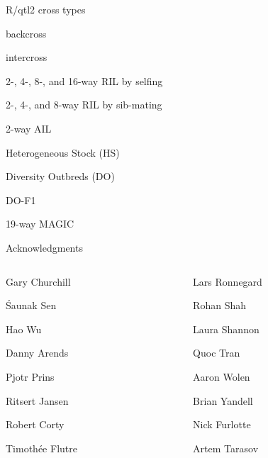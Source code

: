 \documentclass[12pt,t]{beamer}
\begin{document}
\begin{frame}{R/qtl2 cross types}

  \bbi
\item backcross
\item intercross
\item 2-, 4-, 8-, and 16-way RIL by selfing
\item 2-, 4-, and 8-way RIL by sib-mating
\item 2-way AIL
\item Heterogeneous Stock (HS)
\item Diversity Outbreds (DO)
\item DO-F1
\item 19-way MAGIC
  \ei


\end{frame}



\begin{frame}[c]{Acknowledgments}

\begin{columns}[T]
  \begin{column}[T]{0.5\textwidth}
    \vspace{0pt}
\bi
\item[] Gary Churchill
\item[] \'Saunak Sen
\item[] Hao Wu
\item[] Danny Arends
\item[] Pjotr Prins
\item[] Ritsert Jansen
\item[] Robert Corty
\item[] Timoth\'ee Flutre
  \ei
  \end{column} \hfill
\begin{column}[T]{0.5\textwidth}
\vspace*{0mm}

  \bi
\item[] Lars Ronnegard
\item[] Rohan Shah
\item[] Laura Shannon
\item[] Quoc Tran
\item[] Aaron Wolen
\item[] Brian Yandell
\item[] Nick Furlotte
\item[] Artem Tarasov
  \ei
\end{column}
\end{columns}

\end{frame}
\end{document}
